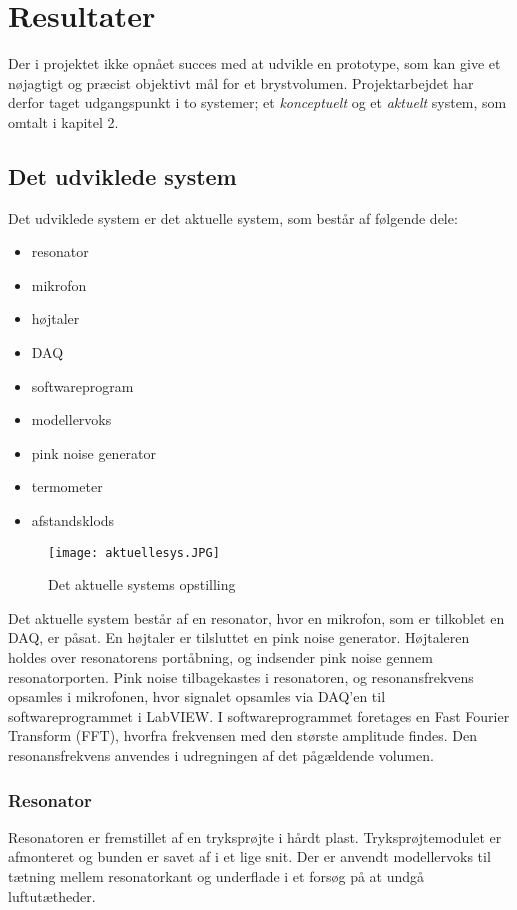 \chapter{Resultater}
Der i projektet ikke opnået succes med at udvikle en prototype, som kan give et nøjagtigt og præcist objektivt mål for et brystvolumen. Projektarbejdet har derfor taget udgangspunkt i to systemer; et \textit{konceptuelt} og et \textit{aktuelt} system, som omtalt i kapitel 2.  

\section{Det udviklede system}
Det udviklede system er det aktuelle system, som består af følgende dele: 

\begin{itemize}
\item resonator	
\item mikrofon 
\item højtaler
\item DAQ
\item softwareprogram
\item modellervoks
\item pink noise generator
\item termometer
\item afstandsklods
\end{itemize}

\begin{figure}[!h]
\centering
\texttt{[image: aktuellesys.JPG]}
\caption{Det aktuelle systems opstilling}
\label{fig:aktuellesys}	
\end{figure}

 Det aktuelle system består af en resonator, hvor en mikrofon, som er tilkoblet en DAQ, er påsat. En højtaler er tilsluttet en pink noise generator. Højtaleren holdes over resonatorens portåbning, og indsender pink noise gennem resonatorporten. Pink noise tilbagekastes i resonatoren, og resonansfrekvens opsamles i mikrofonen, hvor signalet opsamles via DAQ'en til softwareprogrammet i LabVIEW. I softwareprogrammet foretages en Fast Fourier Transform (FFT), hvorfra frekvensen med den største amplitude findes. Den resonansfrekvens anvendes i udregningen af det pågældende volumen.   

\subsection{Resonator}
Resonatoren er fremstillet af en tryksprøjte i hårdt plast. Tryksprøjtemodulet er afmonteret og bunden er savet af i et lige snit. Der er anvendt modellervoks til tætning mellem resonatorkant og underflade i et forsøg på at undgå luftutætheder. 

